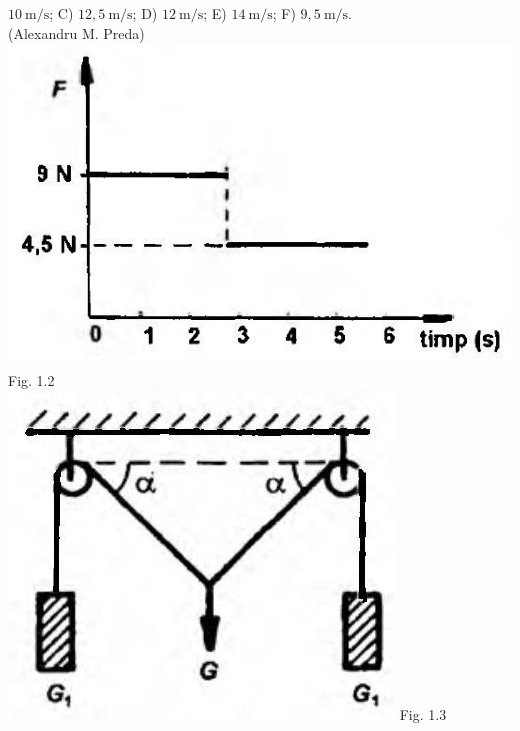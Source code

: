 \documentclass[10pt]{article}
\begin{document}
$10 \mathrm{~m} / \mathrm{s}$; C) $12,5 \mathrm{~m} / \mathrm{s}$; D) $12 \mathrm{~m} / \mathrm{s}$; E) $14 \mathrm{~m} / \mathrm{s}$; F) $9,5 \mathrm{~m} / \mathrm{s}$.\\ (Alexandru M. Preda)\\ \includegraphics[max width=\textwidth, center]{2025_07_01_5b3ff9fa0d508c8e9f17g-010(1)} Fig. 1.2\\ \includegraphics[max width=\textwidth, center]{2025_07_01_5b3ff9fa0d508c8e9f17g-010} Fig. 1.3\\
\end{document}
